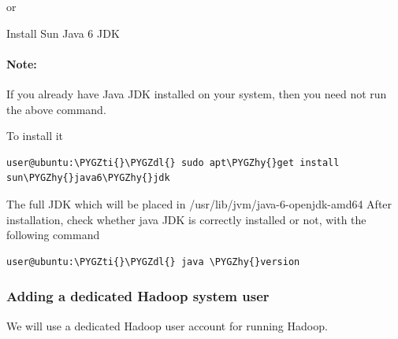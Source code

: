 \documentclass[letterpaper,10pt,english]{sphinxmanual}
\def\PYGZdl{\char`\$}
\def\PYGZhy{\char`\-}
\def\PYGZti{\char`\~}
\begin{document}
or

Install Sun Java 6 JDK
\begin{figure}[htbp]
\centering

\end{figure}


\paragraph{Note:}
\label{hadoop:note}
If you already have Java JDK installed on your system, then you need not run the above command.

To install it

\begin{Verbatim}[commandchars=\\\{\}]
user@ubuntu:\PYGZti{}\PYGZdl{} sudo apt\PYGZhy{}get install sun\PYGZhy{}java6\PYGZhy{}jdk
\end{Verbatim}

The full JDK which will be placed in /usr/lib/jvm/java-6-openjdk-amd64
After installation, check whether java JDK is correctly installed or not, with the following command

\begin{Verbatim}[commandchars=\\\{\}]
user@ubuntu:\PYGZti{}\PYGZdl{} java \PYGZhy{}version
\end{Verbatim}


\subsubsection{Adding a dedicated Hadoop system user}
\label{hadoop:adding-a-dedicated-hadoop-system-user}
We will use a dedicated Hadoop user account for running Hadoop.
\end{document}
